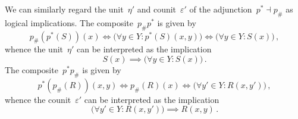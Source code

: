 We can similarly regard the unit~$η'$ and counit~$ε'$ of the adjunction~$p^* ⊣ p_\#$ as logical implications.
The composite~$p_\# p^*$ is given by
\[
	p_\#( p^*(S) )(x)
	\iff
	\bigl( \forall y ∈ Y: p^*(S)(x, y) \bigr)
	\iff
	\bigl( \forall y ∈ Y: S(x) \bigr) \,,
\]
whence the unit~$η'$ can be interpreted as the implication
\[
	S(x) \implies \bigl( \forall y ∈ Y: S(x) \bigr) \,.
\]
The composite~$p^* p_\#$ is given by
\[
	p^*( p_\#(R) )(x, y)
	\iff
	p_\#(R)(x)
	\iff
	\bigl( \forall y' ∈ Y : R(x, y') \bigr) \,,
\]
whence the counit~$ε'$ can be interpreted as the implication
\[
	\bigl( \forall y' ∈ Y : R(x, y') \bigr)
	\implies
	R(x, y) \,.
\]
